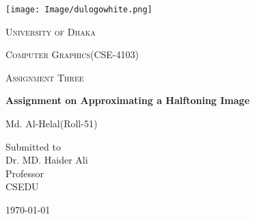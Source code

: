 \documentclass[12pt,a4paper]{report}
\begin{document}
\begin{titlepage}
\centering
\texttt{[image: Image/dulogowhite.png]}\\
{\scshape\LARGE University of Dhaka \par}
\vspace{1cm}
{\scshape\Large Computer Graphics(CSE-4103)\par}
\vspace{1cm}
{\scshape\Large Assignment Three\par}
\vspace{1.5cm}
{\huge\bfseries Assignment on Approximating a Halftoning Image\par}
\vspace{2cm}
{\Large Md. Al-Helal(Roll-51)\par}
\vfill
Submitted to \\
\vspace{0.5cm}
Dr. MD. Haider Ali\\ Professor\\CSEDU
\vfill
{\large \today\par}
\end{titlepage}
\end{document}
